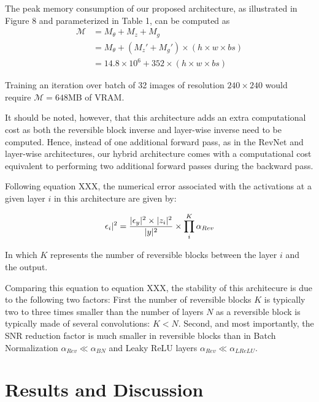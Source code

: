 \documentclass[twocolumn]{bmcart}
\begin{document}
The peak memory consumption of our proposed architecture, as illustrated in Figure 8 and parameterized in Table 1, can be computed as
\begin{subequations}
\begin{align}
\mathcal{M} &= M_{\theta} + M_{z} + M_{g} \\
            &= M_{\theta} + (M_z' + M_{g}') \times (h \times w \times bs) \\
            &= 14.8 \times 10^6 + 352 \times (h \times w \times bs)
\end{align}
\end{subequations}

Training an iteration over batch of 32 images of resolution $240 \times 240$ would require $\mathcal{M}=648$MB of VRAM.

It should be noted, however, that this architecture adds an extra computational cost as both the reversible block inverse and layer-wise inverse need to be computed.
Hence, instead of one additional forward pass, as in the RevNet and layer-wise architectures,
our hybrid architecture comes with a computational cost equivalent to performing two additional forward passes
during the backward pass.

Following equation XXX, the numerical error associated with the activations at a given layer $i$ in this architecture are given by:

\begin{equation}
\epsilon_i |^2 =  \frac{| \epsilon_y |^2 \times | z_i |^2}{| y |^2} \times \prod_i^{K} \alpha_{Rev} \\
\end{equation}

In which $K$ represents the number of reversible blocks between the layer $i$ and the output.

Comparing this equation to equation XXX, the stability of this architecure is due to the following two factors:
First the number of reversible blocks $K$ is typically two to three times smaller
than the number of layers $N$ as a reversible block is typically made of several convolutions: $K<N$.
Second, and most importantly, the SNR reduction factor is much smaller in reversible blocks
than in Batch Normalization $\alpha_{Rev} \ll \alpha_{BN}$ and Leaky ReLU layers $\alpha_{Rev} \ll \alpha_{LReLU}$.

\section{Results and Discussion}
\end{document}
